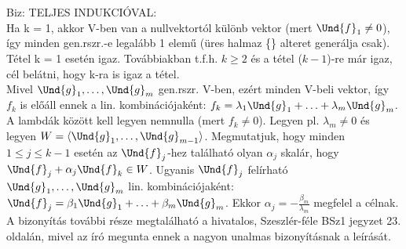 \begin{leftbar}
Biz: TELJES INDUKCIÓVAL:\\
Ha k = 1, akkor V-ben van a nullvektortól különb vektor (mert $\Und{f}_{1} \neq 0$), így minden gen.rszr.-e legalább 1 elemű (üres halmaz \{\} alteret generálja csak). Tétel k = 1 esetén igaz. Továbbiakban t.f.h. $k \geq 2$ és a tétel ($k - 1$)-re már igaz, cél belátni, hogy k-ra is igaz a tétel.\\
Mivel $\Und{g}_1,\ldots,\Und{g}_m$ gen.rszr. V-ben, ezért minden V-beli vektor, így $f_k$ is előáll ennek a lin. kombinációjaként: $f_k = \lambda_1\Und{g}_1 + \ldots + \lambda_m\Und{g}_m$. A lambdák között kell legyen nemnulla (mert $f_k \neq 0$). Legyen pl. $\lambda_m \neq 0$ és legyen $W = \langle \Und{g}_1, \ldots, \Und{g}_{m-1} \rangle$. Megmutatjuk, hogy minden $1 \leq j \leq k-1$ esetén az $\Und{f}_j$-hez található olyan $\alpha_j$ skalár, hogy $\Und{f}_j + \alpha_j\Und{f}_k \in W$. Ugyanis $\Und{f}_j$ felírható $\Und{g}_1,\ldots,\Und{g}_m$ lin. kombinációjaként: $\Und{f}_j = \beta_1\Und{g}_1+\ldots+\beta_m\Und{g}_m$. Ekkor $\alpha_j = -\frac{\beta_m}{\lambda_m}$ megfelel a célnak. A bizonyítás további része megtalálható a hivatalos, Szeszlér-féle BSz1 jegyzet 23. oldalán, mivel az író megunta ennek a nagyon unalmas bizonyításnak a leírását.
\end{leftbar}
